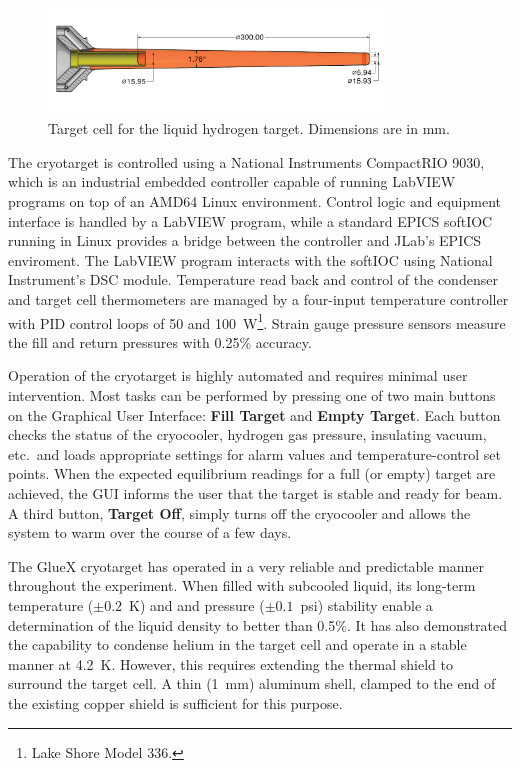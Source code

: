\begin{figure}
\includegraphics[width=3.5in]{figures/GluexCell_mm.pdf}
\caption{Target cell for the liquid hydrogen target.  Dimensions are in mm.  }
\label{fig:TargetCell}
\end{figure}

The cryotarget is controlled using a
National Instruments CompactRIO 9030, which is an industrial embedded controller 
capable of running LabVIEW programs on top of an AMD64 Linux environment. 
Control logic and equipment interface is handled by a LabVIEW program, 
while a standard EPICS softIOC running in Linux provides a
bridge between the controller and JLab's EPICS enviroment. The LabVIEW program interacts
with the softIOC using National Instrument's DSC module.    
Temperature read back and control of the condenser and target cell thermometers
are managed by a four-input temperature
controller with PID control loops of 50 and 100~W\footnote{Lake Shore Model 336.}.
Strain gauge pressure sensors measure the fill and return pressures with 0.25\% 
accuracy.  

Operation of the cryotarget is highly automated and requires minimal user intervention.
Most tasks can be performed by pressing one of two main buttons on
the Graphical User Interface: {\bf Fill Target} and {\bf Empty Target}.
Each button checks the status of the cryocooler, hydrogen gas pressure, insulating vacuum, etc.\
and loads appropriate settings for alarm values and temperature-control set points.  
When the expected equilibrium readings for a full (or empty) target are achieved, the
GUI informs the user that the target is stable and ready for beam.  A third button, {\bf Target Off},
simply turns off the cryocooler and allows the system to warm over the course of a few days.

The GlueX cryotarget has operated in a very reliable and predictable manner throughout the
experiment.  When filled with subcooled liquid, its long-term temperature ($\pm 0.2$~K) and
and pressure ($\pm 0.1$~psi) stability enable a determination of the liquid density to better than 0.5\%.
It has also demonstrated the capability to condense helium
in the target cell and operate in a stable manner at 4.2~K.  However, this requires extending the
thermal shield to surround the target cell. A thin (1~mm) aluminum shell, clamped to the end
of the existing copper shield is sufficient for this purpose.
